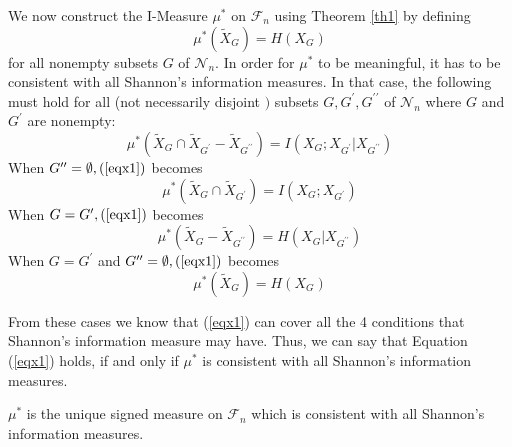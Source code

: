 We now construct the I-Measure $\mu^{*}$ on $\mathcal{F}_{n}$ using Theorem \ref{th1} by defining%
\begin{equation}
    \mu^{*}\left(\tilde{X}_{G}\right)=H\left(X_{G}\right)
\end{equation}
for all nonempty subsets $G$ of $\mathcal{N}_{n} .$ In order for $\mu^{*}$ to be meaningful, it has to be consistent with all Shannon's information measures. In that case, the following must hold for all (not necessarily disjoint $)$ subsets $G, G^{\prime}, G^{\prime \prime}$ of $\mathcal{N}_{n}$ where $G$ and $G^{\prime}$ are nonempty:
\begin{equation}\label{eqx1}
    \mu^{*}\left(\tilde{X}_{G} \cap \tilde{X}_{G^{\prime}}-\tilde{X}_{G^{\prime \prime}}\right)=I\left(X_{G} ; X_{G^{\prime}} | X_{G^{\prime \prime}}\right)
\end{equation}
When $G^{\prime \prime}=\emptyset,(\ref{eqx1})$ becomes
\begin{equation}
\mu^{*}\left(\tilde{X}_{G} \cap \tilde{X}_{G^{\prime}}\right)=I\left(X_{G} ; X_{G^{\prime}}\right)
\end{equation}
When $G=G^{\prime},(\ref{eqx1})$ becomes
\begin{equation}
\mu^{*}\left(\tilde{X}_{G}-\tilde{X}_{G^{\prime \prime}}\right)=H\left(X_{G} | X_{G^{\prime \prime}}\right)
\end{equation}
When $G=G^{\prime}$ and $G^{\prime \prime}=\emptyset,(\ref{eqx1})$ becomes
\begin{equation}
    \mu^{*}\left(\tilde{X}_{G}\right)=H\left(X_{G}\right)
\end{equation}

From these cases we know that (\ref{eqx1}) can cover all the 4 conditions that Shannon's information measure may have. Thus, we can say that Equation (\ref{eqx1}) holds, if and only if $\mu^{*}$ is consistent with all Shannon's information measures.

\begin{theorem} $\mu^{*}$ is the unique signed measure on $\mathcal{F}_{n}$ which is consistent with all Shannon's information measures.
\end{theorem}

